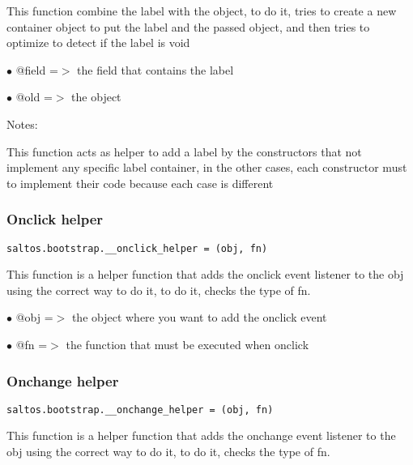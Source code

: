 \documentclass[a4paper]{article}
\begin{document}
This function combine the label with the object, to do it, tries to create a new
container object to put the label and the passed object, and then tries to optimize
to detect if the label is void

\begin{compactitem}
\item[\color{myblue}$\bullet$] @field =$>$ the field that contains the label
\item[\color{myblue}$\bullet$] @old   =$>$ the object
\end{compactitem}

Notes:

This function acts as helper to add a label by the constructors that not implement
any specific label container, in the other cases, each constructor must to implement
their code because each case is different

\hypertarget{toc657}{}
\subsubsection{Onclick helper}

\begin{lstlisting}
saltos.bootstrap.__onclick_helper = (obj, fn)
\end{lstlisting}

This function is a helper function that adds the onclick event listener to the obj
using the correct way to do it, to do it, checks the type of fn.

\begin{compactitem}
\item[\color{myblue}$\bullet$] @obj   =$>$ the object where you want to add the onclick event
\item[\color{myblue}$\bullet$] @fn    =$>$ the function that must be executed when onclick
\end{compactitem}

\hypertarget{toc658}{}
\subsubsection{Onchange helper}

\begin{lstlisting}
saltos.bootstrap.__onchange_helper = (obj, fn)
\end{lstlisting}

This function is a helper function that adds the onchange event listener to the obj
using the correct way to do it, to do it, checks the type of fn.
\end{document}
